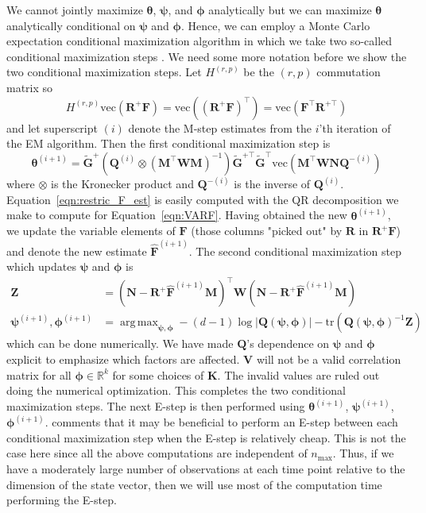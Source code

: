 \documentclass[notitlepage]{article}
\DeclareMathOperator*{\argmax}{arg\,max}
\renewcommand{\vec}[1]{\bm{#1}}
\newcommand{\mat}[1]{\mathbf{#1}}
\newcommand{\Lparen}[1]{\left( #1\right)}
\newcommand{\Lvert}[1]{\left\vert #1\right\vert}
\newcommand{\optor}[2]{#1\Lparen{#2}}
\newcommand{\vecOP}[1]{\optor{\text{vec}}{#1}}
\newcommand{\dimState}{p}
\newcommand{\dimRng}{r}
\newcommand{\nPeriods}{d}
\newcommand{\nMax}{n_{\text{max}}}
\begin{document}
We cannot jointly maximize $\vec{\theta}$, $\vec{\psi}$, and $\vec{\phi}$ analytically but we can maximize $\vec{\theta}$ analytically conditional on $\vec{\psi}$ and $\vec{\phi}$. Hence, we can employ a Monte Carlo expectation conditional maximization algorithm in which we take two so-called conditional maximization steps \citep[see][on the, non-Monte Carlo, expectation maximization algorithm]{meng93}. We need some more notation before we show the two conditional maximization steps. Let $H^{(\dimRng, \dimState)}$ be the $(\dimRng, \dimState)$ commutation matrix so %
%
$$
H^{(\dimRng, \dimState)}\vecOP{\mat{R}^+\mat{F}} 
	= \vecOP{\Lparen{\mat{R}^+\mat{F}}^\top}
	= \vecOP{\mat{F}^\top\mat{R}^{+\top}}
$$%
%
and let superscript $(i)$ denote the M-step estimates from the $i$'th iteration of the EM algorithm. Then the first conditional maximization step is %
%
\begin{equation}\label{eqn:restric_F_est}
\vec{\theta}^{(i + 1)} =
	\tilde{\mat{G}}^+
	\Lparen{\mat{Q}^{(i)} \otimes \Lparen{\mat{M}^\top\mat{W}\mat{M}}^{-1}}
	\tilde{\mat{G}}^{+\top}\tilde{\mat{G}}^\top	
	\vecOP{\mat{M}^\top\mat{W}\mat{N}\mat{Q}^{-(i)}}
\end{equation}%
% 
where $\otimes$ is the Kronecker product and $\mat{Q}^{-(i)}$ is the inverse 
of $\mat{Q}^{(i)}$. Equation~\eqref{eqn:restric_F_est} is easily computed 
with the QR decomposition we 
make to compute for Equation~\eqref{eqn:VARF}. Having obtained the new 
$\vec{\theta}^{(i + 1)}$, we update the variable elements of $\mat{F}$ (those 
columns "picked out" by $\mat{R}$ in $\mat{R}^+\mat{F}$) and denote the new 
estimate $\widehat{\mat{F}}^{(i + 1)}$. The second conditional maximization 
step which updates $\vec{\psi}$ and $\vec{\phi}$ is %
%
\begin{align*}
\mat{Z} &= \Lparen{\mat{N} - \mat{R}^+\widehat{\mat{F}}^{(i +1)}\mat{M}}^\top\mat{W}
           \Lparen{\mat{N} - \mat{R}^+\widehat{\mat{F}}^{(i +1)}\mat{M}} \\
\vec{\psi}^{(i+1)},\vec{\phi}^{(i+1)} &= \argmax_{\vec{\psi},\vec{\phi}} 
   -(\nPeriods - 1)\log\Lvert{\mat{Q}(\vec{\psi},\vec{\phi})}
   -\text{tr}\Lparen{\mat{Q}(\vec{\psi},\vec{\phi})^{-1}\mat{Z}}
\end{align*}%
% 
which can be done numerically. We have made $\mat{Q}$'s dependence on $\vec{\psi}$ and $\vec{\phi}$ explicit to emphasize which factors are affected. $\mat{V}$ will not be a valid correlation matrix for all $\vec\phi\in\mathbb{R}^k$ for some choices of $\mat{K}$. The invalid values are ruled out doing the numerical optimization. This completes the two conditional maximization steps. The next E-step is then performed using $\vec{\theta}^{(i + 1)}$, $\vec{\psi}^{(i +1)}$, $\vec{\phi}^{(i + 1)}$. \citet[][see the discussion]{meng93} comments that it may be beneficial to perform an E-step between each conditional maximization step when the E-step is relatively cheap. 
This is not the case here since all the above computations are independent 
of $\nMax$.
Thus, if we have a moderately large number of observations at each time point relative to 
the dimension of the state vector, then we will use most of the 
computation time performing the E-step.
\end{document}
